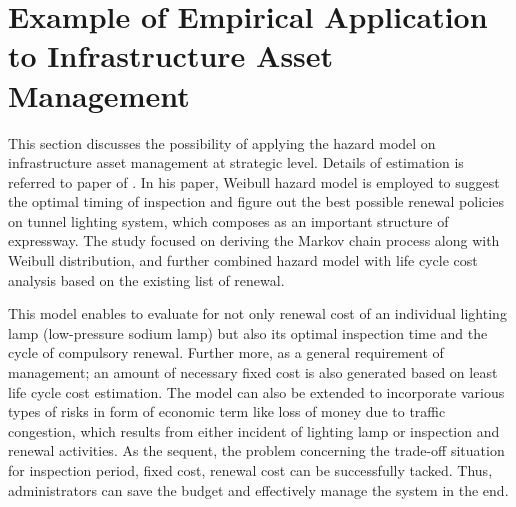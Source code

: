 % 
\section{Example of Empirical Application to Infrastructure Asset Management}
\label{27}
This section discusses the possibility of applying the hazard model on infrastructure asset management at strategic level. Details of estimation is referred to paper of \citet{aokia}. In his paper, Weibull hazard model is employed to suggest the optimal timing of inspection and figure out the best possible renewal policies on tunnel lighting system, which composes as an important structure of expressway. The study focused on deriving the Markov chain process along with Weibull distribution, and further combined hazard model with life cycle cost analysis based on the existing list of renewal.

This model enables to evaluate for not only renewal cost of an individual lighting lamp (low-pressure sodium lamp) but also its optimal inspection time and the cycle of compulsory renewal. Further more, as a general requirement of management; an amount of necessary fixed cost is also generated based on least life cycle cost estimation. The model can also be extended to incorporate various types of risks in form of economic term like loss of money due to traffic congestion, which results from either incident of lighting lamp or inspection and renewal activities. As the sequent, the problem concerning the trade-off situation for inspection period, fixed cost, renewal cost can be successfully tacked. Thus, administrators can save the budget and effectively manage the system in the end.

